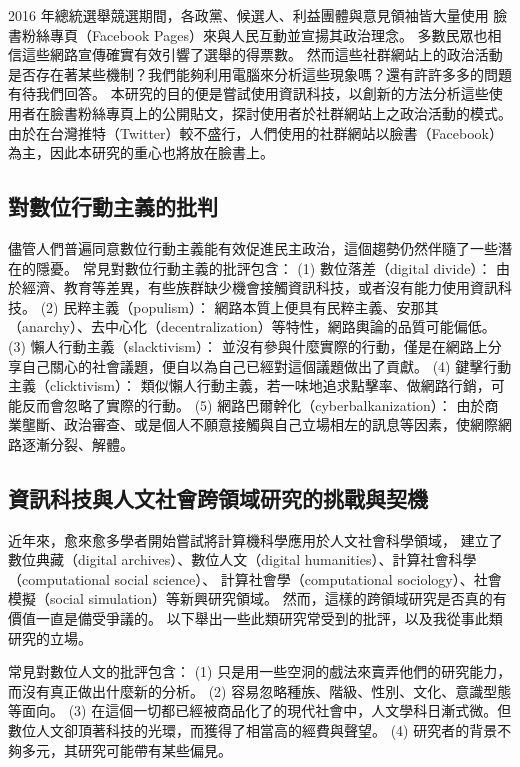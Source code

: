 \documentclass[letterpaper, 10pt, conference]{ieeeconf}   %
\begin{document}
\begin{CJK}{UTF8}{bsmi}
2016 年總統選舉競選期間，各政黨、候選人、利益團體與意見領袖皆大量使用
臉書粉絲專頁（Facebook Pages）來與人民互動並宣揚其政治理念。
多數民眾也相信這些網路宣傳確實有效引響了選舉的得票數。
然而這些社群網站上的政治活動是否存在著某些機制？我們能夠利用電腦來分析這些現象嗎？還有許許多多的問題有待我們回答。
本研究的目的便是嘗試使用資訊科技，以創新的方法分析這些使用者在臉書粉絲專頁上的公開貼文，探討使用者於社群網站上之政治活動的模式。
由於在台灣推特（Twitter）較不盛行，人們使用的社群網站以臉書（Facebook）為主，因此本研究的重心也將放在臉書上。

\subsection*{對數位行動主義的批判}

儘管人們普遍同意數位行動主義能有效促進民主政治，這個趨勢仍然伴隨了一些潛在的隱憂。
常見對數位行動主義的批評包含：
 (1) 數位落差（digital divide）：
由於經濟、教育等差異，有些族群缺少機會接觸資訊科技，或者沒有能力使用資訊科技。
 (2) 民粹主義（populism）：
網路本質上便具有民粹主義、安那其（anarchy）、去中心化（decentralization）等特性，網路輿論的品質可能偏低。
 (3) 懶人行動主義（slacktivism）：
並沒有參與什麼實際的行動，僅是在網路上分享自己關心的社會議題，便自以為自己已經對這個議題做出了貢獻。
 (4) 鍵擊行動主義（clicktivism）：
類似懶人行動主義，若一味地追求點擊率、做網路行銷，可能反而會忽略了實際的行動。
 (5) 網路巴爾幹化（cyberbalkanization）：
由於商業壟斷、政治審查、或是個人不願意接觸與自己立場相左的訊息等因素，使網際網路逐漸分裂、解體。

\subsection*{資訊科技與人文社會跨領域研究的挑戰與契機}

近年來，愈來愈多學者開始嘗試將計算機科學應用於人文社會科學領域，
建立了數位典藏（digital archives）、數位人文（digital humanities）、計算社會科學（computational social science）、
計算社會學（computational sociology）、社會模擬（social simulation）等新興研究領域。
然而，這樣的跨領域研究是否真的有價值一直是備受爭議的。
以下舉出一些此類研究常受到的批評，以及我從事此類研究的立場。

常見對數位人文的批評包含：
 (1) 只是用一些空洞的戲法來賣弄他們的研究能力，而沒有真正做出什麼新的分析。
 (2) 容易忽略種族、階級、性別、文化、意識型態等面向。
 (3) 在這個一切都已經被商品化了的現代社會中，人文學科日漸式微。但數位人文卻頂著科技的光環，而獲得了相當高的經費與聲望。
 (4) 研究者的背景不夠多元，其研究可能帶有某些偏見。


\end{CJK}
\end{document}
